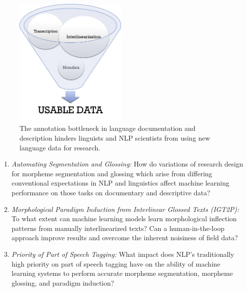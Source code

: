\begin{figure}[!b]
    \centering
    \includegraphics[width=5.5cm]{figs/AnnotationFunnel.jpg}
    \caption[Annotation Bottleneck]{The annotation bottleneck in language documentation and description hinders linguists and NLP scientists from using new language data for research.}
    \label{fig:bottleneck}
\end{figure}


\begin{enumerate}
\item{} \emph{Automating Segmentation and Glossing:} How do variations of research design for morpheme segmentation and glossing which arise from differing conventional expectations in NLP and linguistics affect machine learning performance on those tasks on documentary and descriptive data? 

\item{} \emph{Morphological Paradigm Induction from Interlinear Glossed Texts (IGT2P):} To what extent can machine learning models learn morphological inflection patterns from manually interlinearized texts? Can a human-in-the-loop approach improve results and overcome the inherent noisiness of field data?

\item \emph{Priority of Part of Speech Tagging:} 
What impact does NLP's traditionally high priority on part of speech tagging have on the ability of machine learning systems to perform accurate morpheme segmentation, morpheme glossing, and paradigm induction?
\end{enumerate}

